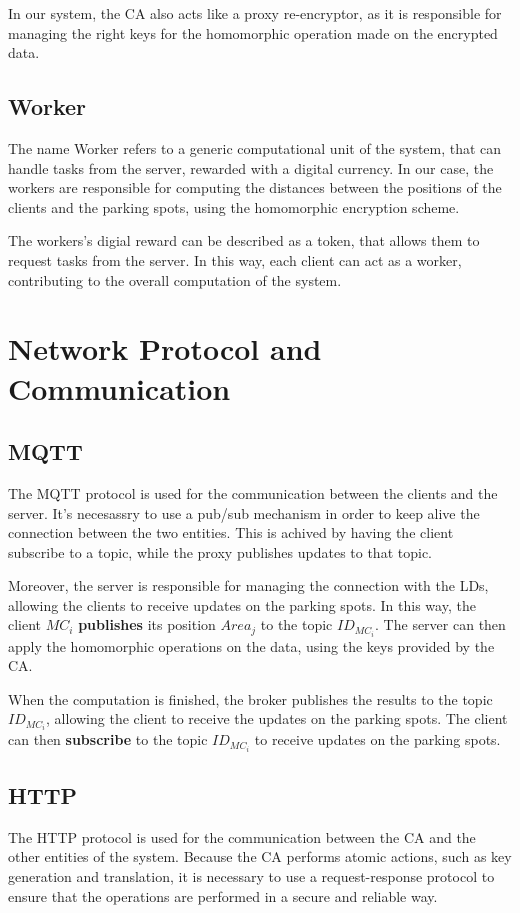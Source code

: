 \documentclass[12pt,a4paper,twoside]{book}
\begin{document}
In our system, the CA also acts like a proxy re-encryptor\cite{POLYAKOV2017FastPRE}, as it is responsible for managing the right keys for the homomorphic operation made on the encrypted data. 

\subsection{Worker}
The name Worker refers to a generic computational unit of the system, that can handle tasks from the server, rewarded with a digital currency. In our case, the workers are responsible for computing the distances between the positions of the clients and the parking spots, using the homomorphic encryption scheme. 

The workers's digial reward can be described as a token, that allows them to request tasks from the server. In this way, each client can act as a worker, contributing to the overall computation of the system.

\section{Network Protocol and Communication}
\subsection{MQTT}

The MQTT protocol is used for the communication between the clients and the server. It's necesassry to use a pub/sub mechanism in order to keep alive the connection between the two entities. This is achived by having the client subscribe to a topic, while the proxy publishes updates to that topic.

Moreover, the server is responsible for managing the connection with the LDs, allowing the clients to receive updates on the parking spots. In this way, the client $MC_i$ \textbf{publishes} its position $Area_j$ to the topic $ID_{MC_i}$. The server can then apply the homomorphic operations on the data, using the keys provided by the CA.

When the computation is finished, the broker publishes the results to the topic $ID_{MC_i}$, allowing the client to receive the updates on the parking spots. The client can then \textbf{subscribe} to the topic $ID_{MC_i}$ to receive updates on the parking spots.

\subsection{HTTP}
The HTTP protocol is used for the communication between the CA and the other entities of the system. Because the CA performs atomic actions, such as key generation and translation, it is necessary to use a request-response protocol to ensure that the operations are performed in a secure and reliable way.
\end{document}
